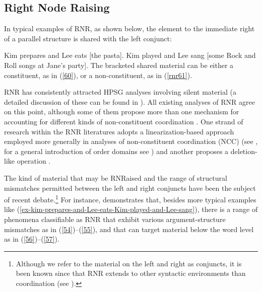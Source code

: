 {\subsection{Right Node Raising}

In typical examples of RNR, as shown below, the element to the immediate right of a parallel structure is shared with the left conjunct:

\eal
\label{ex-kim-prepares-and-Lee-eats-Kim-played-and-Lee-sang}
\ex  Kim prepares and Lee eats [the pasta].  \label{60}
\ex  Kim played and Lee sang [some Rock and Roll songs at Jane's party]. \label{rnr61}
\zl
%
The bracketed shared material can be either a constituent, as in (\ref{60}), or a non-constituent, as in (\ref{rnr61}).

RNR has consistently attracted HPSG analyses involving silent material (a detailed discussion of these can be found
in ). 
All existing analyses of RNR \citep{Abeille2016, Beavers2004, Chaves2014, Crysmann2003, Shiraishi2019, Yatabe2001, Yatabe2012} agree on this point,
although some of them propose more than one mechanism for accounting for different kinds of non-constituent coordination \citep{Chaves2014, Yatabe2001, Yatabe2012, Yatabe2019}. One strand of research within the RNR literatures adopts a linearization-based approach employed more generally in analyses of non-constituent coordination (NCC) (see \citealt{Yatabe2001, Yatabe2012}, for a general introduction of order domains see ) and another proposes a deletion-like operation \citep{Abeille2016, Chaves2014, Shiraishi2019}.

%

The kind of material that may be RNRaised and the range of structural mismatches permitted between the left and right conjuncts have been the subject of recent debate.\footnote{Although we refer to the material on the left and right as conjuncts, it is been known since \citet{Hudson1976, Hudson1989} that RNR extends to other syntactic environments than coordination (see \citealt{Chaves2014}).} For instance, \citet[839--840]{Chaves2014} demonstrates that, besides more typical examples like (\ref{ex-kim-prepares-and-Lee-eats-Kim-played-and-Lee-sang}),
 there is a range of phenomena classifiable as RNR that exhibit various argument-structure mismatches as in (\ref{54})--(\ref{55}), and that can target material below the word level as in (\ref{56})--(\ref{57}).
%

}
